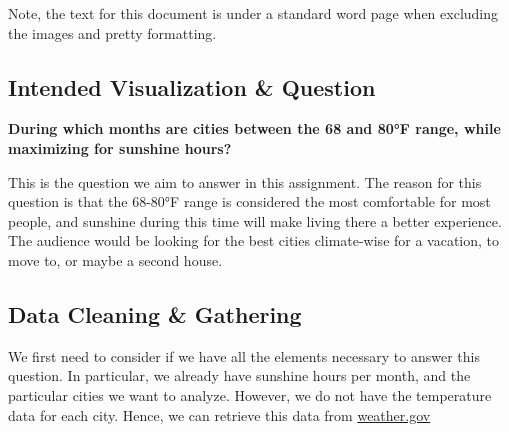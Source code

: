 \documentclass{article}
\begin{document}
\newpage
Note, the text for this document is under a standard word page when excluding the images and pretty formatting. 

\subsection{Intended Visualization \& Question}

\textbf{During which months are cities between the 68 and 80°F range, 
while maximizing for sunshine hours?}

This is the question we aim to answer in this assignment.
The reason for this question is that the 68-80°F range is considered the most comfortable for most people, 
and sunshine during this time will make living there a better experience. 
The audience would be looking for the best cities climate-wise for a vacation, to move to, or maybe a second house.

\subsection{Data Cleaning \& Gathering}

We first need to consider if we have all the elements necessary to answer this question.
In particular, we already have sunshine hours per month, and the particular cities we want to analyze.
However, we do not have the temperature data for each city. Hence, we can retrieve this data from \href{https://www.weather.gov/wrh/Climate}{weather.gov} 
\end{document}
